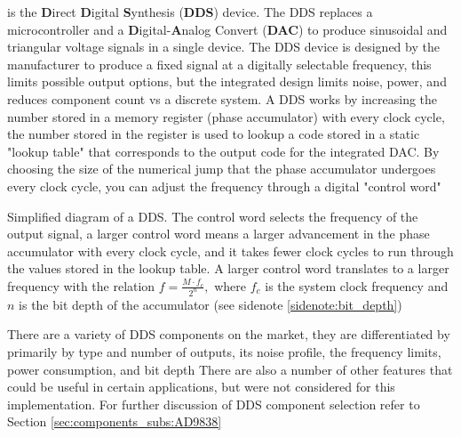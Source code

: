  is the {\bf D}irect {\bf D}igital {\bf S}ynthesis ({\bf DDS}) device. The DDS replaces a microcontroller and a {\bf D}igital-{\bf A}nalog Convert ({\bf DAC}) to produce sinusoidal and triangular voltage signals in a single device.  The DDS device is designed by the manufacturer to produce a fixed signal at a digitally selectable frequency, this limits possible output options, but the integrated design limits noise, power, and reduces component count vs a discrete system. A DDS works by increasing the number stored in a memory register (phase accumulator) with every clock cycle, the number stored in the register is used to lookup a code stored in a static "lookup table" that corresponds to the output code for the integrated DAC. By choosing the size of the numerical jump that the phase accumulator undergoes every clock cycle, you can adjust the frequency through a digital "control word" 

\begin{marginfigure}[-5\baselineskip]
\caption{Simplified diagram of a DDS. The control word selects the frequency of the output signal, a larger control word means a larger advancement in the phase accumulator with every clock cycle, and it takes fewer clock cycles to run through the values stored in the lookup table. A larger control word translates to a larger frequency with the relation $f = \frac{M\cdot f_c}{2^n},$ where $f_c$ is the system clock frequency and $n$ is the bit depth of the accumulator (see sidenote \ref{sidenote:bit_depth})}

\end{marginfigure}



There are a variety of DDS components on the market, they are differentiated by primarily by type and number of outputs, its noise profile, the frequency limits, power consumption, and bit depth  There are also a number of other features that could be useful in certain applications, but were not considered for this implementation. For further discussion of DDS component selection refer to Section \ref{sec:components_subs:AD9838} 

